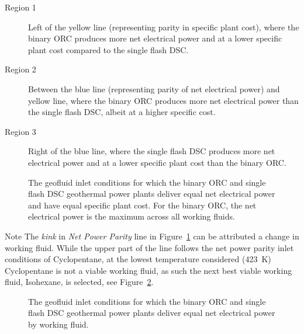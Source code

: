     \begin{description}
       \item[Region 1] Left of the yellow line (representing parity in specific plant cost), where the binary \ac{ORC} produces more net electrical power and at a lower specific plant cost compared to the single flash \ac{DSC}. 
       \item[Region 2] Between the blue line (representing parity of net electrical power) and yellow line, where the binary \ac{ORC} produces more net electrical power than the single flash \ac{DSC}, albeit at a higher specific cost.
       \item[Region 3] Right of the blue line, where the single flash \ac{DSC} produces more net electrical power and at a lower specific plant cost than the binary \ac{ORC}.
    \end{description}

    \begin{figure}[H]
        \centering
        
        \caption[The geofluid inlet conditions for which the binary \ac{ORC} and single flash \ac{DSC} geothermal power plants deliver equal net electrical power and have equal specific plant cost.]{The geofluid inlet conditions for which the binary \ac{ORC} and single flash \ac{DSC} geothermal power plants deliver equal net electrical power and have equal specific plant cost. For the binary \ac{ORC},  the net electrical power is the maximum across all working fluids.}
        \label{fig:prosim_purewater_Breakeven_NetPow}
    \end{figure}

    \begin{notes}{Note}
        The \emph{kink} in \emph{Net Power Parity} line in Figure~\ref{fig:prosim_purewater_Breakeven_NetPow} can be attributed a change in working fluid. While the upper part of the line follows the net power parity inlet conditions of Cyclopentane, at the lowest temperature considered (\qty{423}{\K}) Cyclopentane is not a viable working fluid, as such the next best viable working fluid, Isohexane, is selected, see Figure~\ref{fig:prosim_purewater_Breakeven_NetPow_by_WF}.

        \begin{figure}[H]
            \centering
            
            \caption{The geofluid inlet conditions for which the binary \ac{ORC} and single flash \ac{DSC} geothermal power plants deliver equal net electrical power by working fluid.}
            \label{fig:prosim_purewater_Breakeven_NetPow_by_WF}
        \end{figure}
        
    \end{notes}

